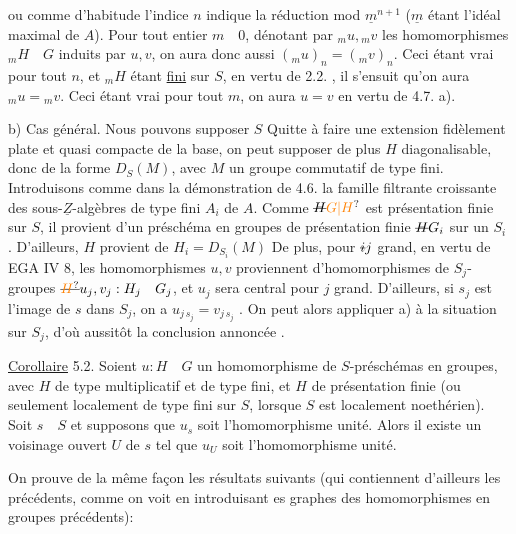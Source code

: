 
ou comme d'habitude l'indice $n$ indique la réduction mod  $\underline{m}^{n+1}$ ($\underline{m}$ étant l'idéal maximal de $A$). Pour tout entier $m\quad 0$, dénotant par $ {}_mu,{}_mv$ les homomorphismes $ {}_mH\quad G$ induits par $u,v$, on aura donc aussi $({}_mu)_n=({}_mv)_n$. Ceci étant vrai pour tout $n$, et $ {}_mH$ étant \uline{fini} sur $S$, en vertu de 2.2. , il s'ensuit qu'on aura $ {}_mu={}_mv$. Ceci étant vrai pour tout $m$, on aura $u=v$ en vertu de 4.7. a).

b) Cas général. Nous  pouvons supposer $S$   Quitte à faire une extension fidèlement plate et quasi compacte de la base, on peut supposer de plus $H$ diagonalisable, donc de la forme $D_S(M)$, avec $M$ un groupe commutatif de type fini. Introduisons comme dans la démonstration de 4.6. la famille filtrante croissante des sous-$\underline{Z}$-algèbres  de type fini $A_i$ de $A$. Comme $\deleted{H}\unsure{G|H}$ est  présentation finie sur $S$, il provient d'un  préschéma en groupes de présentation finie $\deleted{H}G_i$ sur un $S_i$ . D'ailleurs, $H$ provient de $H_i=D_{S_i}(M)$ De plus, pour $\deleted{i}j$ grand, en vertu de EGA IV 8, les homomorphismes  $u,v$ proviennent d'homomorphismes de $S_j$-groupes $\deleted{\unsure{H}}u_j,v_j:H_j\quad G_j$,  et $u_j$ sera central pour $j$ grand. D'ailleurs, si $s_j$ est l'image de $s$ dans $S_j$, on a $u_{j\,s_j}=v_{j\,s_j}$ . On peut alors appliquer a) à la situation sur $S_j$, d'où aussitôt la conclusion annoncée .

\uline{Corollaire} 5.2. Soient $u:H\quad G$ un homomorphisme de $S$\deleted{(}-préschémas en groupes, avec $H$ de type multiplicatif et de type fini, et $H$ de présentation finie (ou seulement localement de  type fini sur $S$, lorsque $S$ est localement noethérien). Soit $s\quad S$ et supposons que $u_s$ soit l'homomorphisme unité. Alors il existe un voisinage ouvert $U$ de $s$ tel que $u_U$ soit l'homomorphisme unité.

On prouve de la même façon les résultats suivants (qui contiennent d'ailleurs les précédents, comme on voit en introduisant es  graphes des homomorphismes en groupes précédents):

